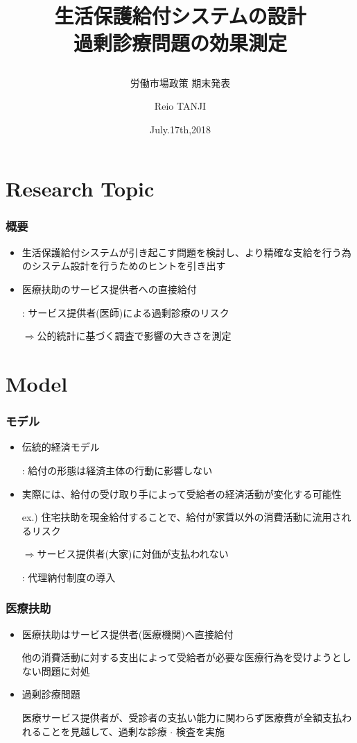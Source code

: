 \documentclass[dvipdfmx,14pt]{beamer}
\title{生活保護給付システムの設計 \\ 過剰診療問題の効果測定
\subtitle{労働市場政策 期末発表}}
\author{Reio TANJI}
\date{July.17th,2018}
\institute{Osaka University}
\begin{document}
\begin{frame}\frametitle{}
\titlepage
\end{frame}

\section{Research Topic}
\begin{frame}\frametitle{概要}

 \begin{itemize}
 
 \item 生活保護給付システムが引き起こす問題を検討し、より精確な支給を行う為のシステム設計を行うためのヒントを引き出す
 
 \item 医療扶助のサービス提供者への直接給付
 
 : サービス提供者(医師)による過剰診療のリスク
 
 $\Rightarrow$公的統計に基づく調査で影響の大きさを測定
 
 \end{itemize}

\end{frame}

\section{Model}
\begin{frame}\frametitle{モデル}

 \begin{itemize}
 
 \item 伝統的経済モデル
 
 : 給付の形態は経済主体の行動に影響しない
 
 \item 実際には、給付の受け取り手によって受給者の経済活動が変化する可能性
 
 ex.) 住宅扶助を現金給付することで、給付が家賃以外の消費活動に流用されるリスク
 
 $\Rightarrow$サービス提供者(大家)に対価が支払われない
 
 : 代理納付制度の導入
 
 \end{itemize}

\end{frame}

\begin{frame}\frametitle{医療扶助}

 \begin{itemize}
 
 \item 医療扶助はサービス提供者(医療機関)へ直接給付
 
 他の消費活動に対する支出によって受給者が必要な医療行為を受けようとしない問題に対処
 
 \item 過剰診療問題
 
 医療サービス提供者が、受診者の支払い能力に関わらず医療費が全額支払われることを見越して、過剰な診療 $\cdot$ 検査を実施
 
 \end{itemize}

\end{frame}
\end{document}
